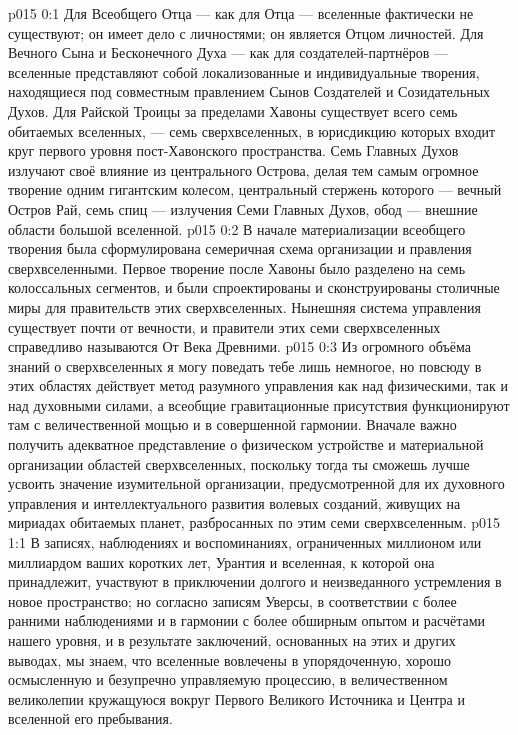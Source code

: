 \author{Всеобщий Цензор}
\vs p015 0:1 Для Всеобщего Отца --- как для Отца --- вселенные фактически не существуют; он имеет дело с личностями; он является Отцом личностей. Для Вечного Сына и Бесконечного Духа --- как для создателей\hyp{}партнёров --- вселенные представляют собой локализованные и индивидуальные творения, находящиеся под совместным правлением Сынов Создателей и Созидательных Духов. Для Райской Троицы за пределами Хавоны существует всего семь обитаемых вселенных, --- семь сверхвселенных, в юрисдикцию которых входит круг первого уровня пост\hyp{}Хавонского пространства. Семь Главных Духов излучают своё влияние из центрального Острова, делая тем самым огромное творение одним гигантским колесом, центральный стержень которого --- вечный Остров Рай, семь спиц --- излучения Семи Главных Духов, обод --- внешние области большой вселенной.
\vs p015 0:2 В начале материализации всеобщего творения была сформулирована семеричная схема организации и правления сверхвселенными. Первое творение после Хавоны было разделено на семь колоссальных сегментов, и были спроектированы и сконструированы столичные миры для правительств этих сверхвселенных. Нынешняя система управления существует почти от вечности, и правители этих семи сверхвселенных справедливо называются От Века Древними.
\vs p015 0:3 Из огромного объёма знаний о сверхвселенных я могу поведать тебе лишь немногое, но повсюду в этих областях действует метод разумного управления как над физическими, так и над духовными силами, а всеобщие гравитационные присутствия функционируют там с величественной мощью и в совершенной гармонии. Вначале важно получить адекватное представление о физическом устройстве и материальной организации областей сверхвселенных, поскольку тогда ты сможешь лучше усвоить значение изумительной организации, предусмотренной для их духовного управления и интеллектуального развития волевых созданий, живущих на мириадах обитаемых планет, разбросанных по этим семи сверхвселенным.
\vs p015 1:1 В записях, наблюдениях и воспоминаниях, ограниченных миллионом или миллиардом ваших коротких лет, Урантия и вселенная, к которой она принадлежит, участвуют в приключении долгого и неизведанного устремления в новое пространство; но согласно записям Уверсы, в соответствии с более ранними наблюдениями и в гармонии с более обширным опытом и расчётами нашего уровня, и в результате заключений, основанных на этих и других выводах, мы знаем, что вселенные вовлечены в упорядоченную, хорошо осмысленную и безупречно управляемую процессию, в величественном великолепии кружащуюся вокруг Первого Великого Источника и Центра и вселенной его пребывания.
